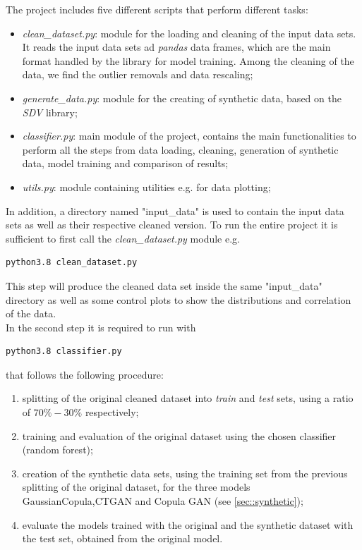 \documentclass{article}
\begin{document}
The project includes five different scripts that perform different tasks:

\begin{itemize}
	\item \textit{clean\_dataset.py}: module for the loading and cleaning of the input data sets. It reads the input data sets ad \textit{pandas} data frames, which are the main format handled by the library for model training. Among the cleaning of the data, we find the outlier removals and data rescaling;\

	\item  \textit{generate\_data.py}: module for the creating of synthetic data, based on the \textit{SDV} library;\


	\item  \textit{classifier.py}: main module of the project, contains the main functionalities to perform all the steps from data loading, cleaning, generation of synthetic data, model training and comparison of results;\

	\item \textit{utils.py}: module containing utilities e.g. for data plotting;\

\end{itemize}

In addition, a directory named "input\_data" is used to contain the input data sets as well as their respective cleaned version.
To run the entire project it is sufficient to first call the \textit{clean\_dataset.py} module e.g.
\begin{verbatim}
python3.8 clean_dataset.py
\end{verbatim}

This step will produce the cleaned data set inside the same "input\_data" directory as well as some control plots to show the distributions and correlation of the data.
\\


In the second step it is required to run with
\begin{verbatim}
python3.8 classifier.py
\end{verbatim}
that follows the following procedure:

\begin{enumerate}
	\item splitting of the original cleaned dataset into \textit{train} and \textit{test} sets, using a ratio of $70\%-30\%$ respectively; \

	\item  training and evaluation of the original dataset using the chosen classifier (random forest);


	\item  creation of the synthetic data sets, using the training set from the previous splitting of the original dataset, for the three models GaussianCopula,CTGAN and Copula GAN (see \ref{sec::synthetic});

	\item evaluate the models trained with the original and the synthetic dataset with the test set, obtained from the original model.

\end{enumerate}
\end{document}

